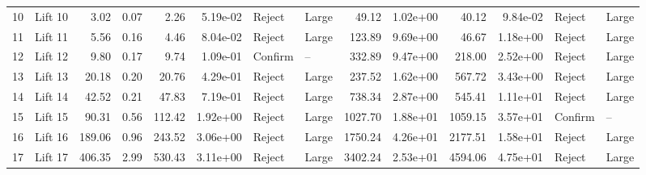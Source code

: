 \begin{tabular}{llrrrrllrrrrll}
10 &  Lift 10 &               3.02 &  0.07 &                2.26 &  5.19e-02 &   Reject &       Large &                    49.12 &  1.02e+00 &                     40.12 &  9.84e-02 &   Reject &       Large \\
11 &  Lift 11 &               5.56 &  0.16 &                4.46 &  8.04e-02 &   Reject &       Large &                   123.89 &  9.69e+00 &                     46.67 &  1.18e+00 &   Reject &       Large \\
12 &  Lift 12 &               9.80 &  0.17 &                9.74 &  1.09e-01 &  Confirm &          -- &                   332.89 &  9.47e+00 &                    218.00 &  2.52e+00 &   Reject &       Large \\
13 &  Lift 13 &              20.18 &  0.20 &               20.76 &  4.29e-01 &   Reject &       Large &                   237.52 &  1.62e+00 &                    567.72 &  3.43e+00 &   Reject &       Large \\
14 &  Lift 14 &              42.52 &  0.21 &               47.83 &  7.19e-01 &   Reject &       Large &                   738.34 &  2.87e+00 &                    545.41 &  1.11e+01 &   Reject &       Large \\
15 &  Lift 15 &              90.31 &  0.56 &              112.42 &  1.92e+00 &   Reject &       Large &                  1027.70 &  1.88e+01 &                   1059.15 &  3.57e+01 &  Confirm &          -- \\
16 &  Lift 16 &             189.06 &  0.96 &              243.52 &  3.06e+00 &   Reject &       Large &                  1750.24 &  4.26e+01 &                   2177.51 &  1.58e+01 &   Reject &       Large \\
17 &  Lift 17 &             406.35 &  2.99 &              530.43 &  3.11e+00 &   Reject &       Large &                  3402.24 &  2.53e+01 &                   4594.06 &  4.75e+01 &   Reject &       Large \\
\bottomrule
\end{tabular}
